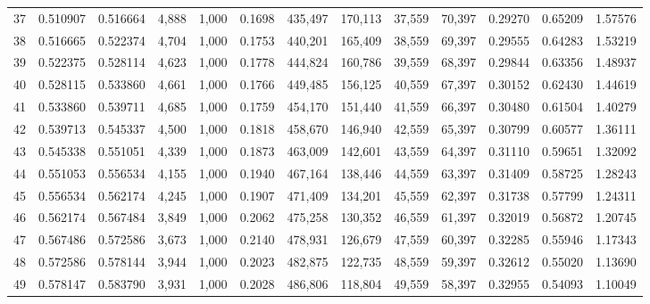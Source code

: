 \begin{tabular}{rrrrrrrrrrrrr}
37  &  0.510907 &  0.516664 &   4,888 &  1,000 &                                     0.1698 &  435,497 &  170,113 &   37,559 &   70,397 &  0.29270 &  0.65209 &  1.57576 \\
38  &  0.516665 &  0.522374 &   4,704 &  1,000 &                                     0.1753 &  440,201 &  165,409 &   38,559 &   69,397 &  0.29555 &  0.64283 &  1.53219 \\
39  &  0.522375 &  0.528114 &   4,623 &  1,000 &                                     0.1778 &  444,824 &  160,786 &   39,559 &   68,397 &  0.29844 &  0.63356 &  1.48937 \\
40  &  0.528115 &  0.533860 &   4,661 &  1,000 &                                     0.1766 &  449,485 &  156,125 &   40,559 &   67,397 &  0.30152 &  0.62430 &  1.44619 \\
41  &  0.533860 &  0.539711 &   4,685 &  1,000 &                                     0.1759 &  454,170 &  151,440 &   41,559 &   66,397 &  0.30480 &  0.61504 &  1.40279 \\
42  &  0.539713 &  0.545337 &   4,500 &  1,000 &                                     0.1818 &  458,670 &  146,940 &   42,559 &   65,397 &  0.30799 &  0.60577 &  1.36111 \\
43  &  0.545338 &  0.551051 &   4,339 &  1,000 &                                     0.1873 &  463,009 &  142,601 &   43,559 &   64,397 &  0.31110 &  0.59651 &  1.32092 \\
44  &  0.551053 &  0.556534 &   4,155 &  1,000 &                                     0.1940 &  467,164 &  138,446 &   44,559 &   63,397 &  0.31409 &  0.58725 &  1.28243 \\
45  &  0.556534 &  0.562174 &   4,245 &  1,000 &                                     0.1907 &  471,409 &  134,201 &   45,559 &   62,397 &  0.31738 &  0.57799 &  1.24311 \\
46  &  0.562174 &  0.567484 &   3,849 &  1,000 &                                     0.2062 &  475,258 &  130,352 &   46,559 &   61,397 &  0.32019 &  0.56872 &  1.20745 \\
47  &  0.567486 &  0.572586 &   3,673 &  1,000 &                                     0.2140 &  478,931 &  126,679 &   47,559 &   60,397 &  0.32285 &  0.55946 &  1.17343 \\
48  &  0.572586 &  0.578144 &   3,944 &  1,000 &                                     0.2023 &  482,875 &  122,735 &   48,559 &   59,397 &  0.32612 &  0.55020 &  1.13690 \\
49  &  0.578147 &  0.583790 &   3,931 &  1,000 &                                     0.2028 &  486,806 &  118,804 &   49,559 &   58,397 &  0.32955 &  0.54093 &  1.10049 \\

\end{tabular}

